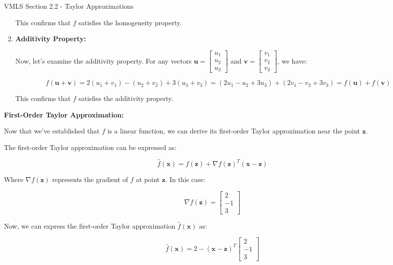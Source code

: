 \begin{notes}{VMLS Section 2.2 - Taylor Approximations}
\begin{highlight}
\begin{enumerate}
            This confirms that \(f\) satisfies the homogeneity property.
            
            \item \textbf{Additivity Property:}
            
            Now, let's examine the additivity property. For any vectors \(\mathbf{u} = \begin{bmatrix} u_1 \\ u_2 \\ u_3 \end{bmatrix}\) and \(\mathbf{v} = \begin{bmatrix} v_1 \\ v_2 \\ v_3 \end{bmatrix}\), we have:
            
            \[f(\mathbf{u} + \mathbf{v}) = 2(u_1 + v_1) - (u_2 + v_2) + 3(u_3 + v_3) = (2u_1 - u_2 + 3u_3) + (2v_1 - v_2 + 3v_3) = f(\mathbf{u}) + f(\mathbf{v})\]
            
            This confirms that \(f\) satisfies the additivity property.
        \end{enumerate}
        
        \textbf{First-Order Taylor Approximation:} \vspace*{1em}
        
        Now that we've established that \(f\) is a linear function, we can derive its first-order Taylor approximation near the point \(\mathbf{z}\).
        
        The first-order Taylor approximation can be expressed as:
        
        \[\hat{f}(\mathbf{x}) = f(\mathbf{z}) + \nabla f(\mathbf{z})^T (\mathbf{x} - \mathbf{z})\]
        
        Where \(\nabla f(\mathbf{z})\) represents the gradient of \(f\) at point \(\mathbf{z}\). In this case:
        
        \[\nabla f(\mathbf{z}) = \begin{bmatrix} 2 \\ -1 \\ 3 \end{bmatrix}\]
        
        Now, we can express the first-order Taylor approximation \(\hat{f}(\mathbf{x})\) as:
        
        \[\hat{f}(\mathbf{x}) = 2 - (\mathbf{x} - \mathbf{z})^T \begin{bmatrix} 2 \\ -1 \\ 3 \end{bmatrix}\]
        

\end{highlight}
\end{notes}
